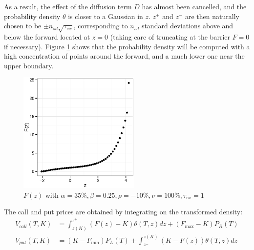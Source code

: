 \documentclass[]{rAMF2e}
\begin{document}
As a result, the effect of the diffusion term $D$ has almost been cancelled, and the probability density $\theta$ is closer to a Gaussian in $z$. $z^+$ and $z^-$ are then naturally chosen to be $\pm n_{sd}\sqrt{\tau_{ex}}$, corresponding to $n_{sd}$ standard deviations above and below the forward located at $z=0$ (taking care of truncating at the barrier $F=0$ if necessary). Figure \ref{fig:Fz} shows that the probability density will be computed with a high concentration of points around the forward, and a much lower one near the upper boundary.

\begin{figure}[htb]
  \begin{center}  
    \includegraphics[width=6cm]{fz.eps}
  \end{center}
     \caption{\label{fig:Fz} $F(z)$ with $\alpha=35\%, \beta=0.25, \rho=-10\%, \nu=100\%, \tau_{ex}=1$}
\end{figure}

The call and put prices are obtained by integrating on the transformed density:
\begin{align}
V_{call} (T, K) &= \int_{z(K)}^{z^{+}} (F(z)-K) \theta(T,z) dz + (F_{\max} - K) P_R(T) \\
V_{put} (T, K) &= (K-F_{\min}) P_L(T) + \int_{z^{-}}^{z(K)} (K-F(z)) \theta(T,z) dz
\end{align}
\end{document}
